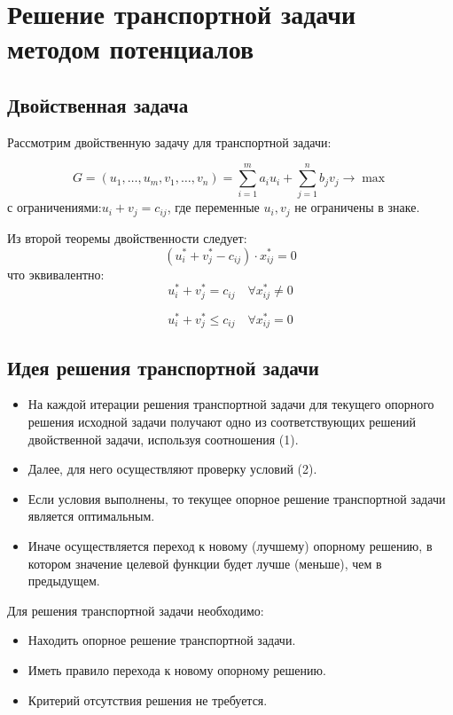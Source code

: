 \documentclass[17pt]{extarticle}
\begin{document}
\section{Решение транспортной задачи методом потенциалов}

\subsection{Двойственная задача}

Рассмотрим двойственную задачу для транспортной задачи:

\[
    G = (u_1, \ldots, u_m, v_1, \ldots, v_n) = \sum_{i=1}^m a_i u_i + \sum_{j=1}^n b_j v_j \rightarrow \max
\]
с ограничениями:$u_i + v_j = c_{ij}$, где переменные \( u_i, v_j \) не ограничены в знаке.

Из второй теоремы двойственности следует:
\[
    (u_i^* + v_j^* - c_{ij}) \cdot x_{ij}^* = 0
\]
что эквивалентно:
\[
    u_i^* + v_j^* = c_{ij} \quad \forall x_{ij}^* \neq 0 \tag{1}
\]

\[
    u_i^* + v_j^* \leq c_{ij} \quad \forall x_{ij}^* = 0 \tag{2}
\]

\subsection{Идея решения транспортной задачи}
\begin{itemize}
    \item На каждой итерации решения транспортной задачи для текущего опорного решения исходной задачи получают одно из соответствующих решений двойственной задачи, используя соотношения (1).
    \item Далее, для него осуществляют проверку условий (2).
    \item Если условия выполнены, то текущее опорное решение транспортной задачи является оптимальным.
    \item Иначе осуществляется переход к новому (лучшему) опорному решению, в котором значение целевой функции будет лучше (меньше), чем в предыдущем.
\end{itemize}

Для решения транспортной задачи необходимо:
\begin{itemize}
    \item Находить опорное решение транспортной задачи.
    \item Иметь правило перехода к новому опорному решению.
    \item Критерий отсутствия решения не требуется.
\end{itemize}
\end{document}
